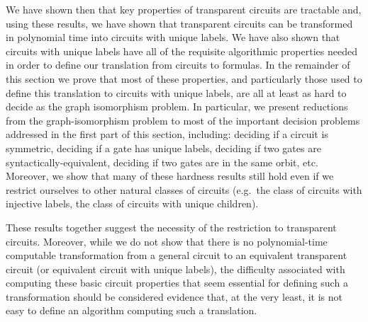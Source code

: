 \documentclass[../paper.tex]{subfiles}
\begin{document}

We have shown then that key properties of transparent circuits are tractable
and, using these results, we have shown that transparent circuits can be
transformed in polynomial time into circuits with unique labels. We have also
shown that circuits with unique labels have all of the requisite algorithmic
properties needed in order to define our translation from circuits to formulas.
In the remainder of this section we prove that most of these properties, and
particularly those used to define this translation to circuits with unique
labels, are all at least as hard to decide as the graph isomorphism problem. In
particular, we present reductions from the graph-isomorphism problem to most of
the important decision problems addressed in the first part of this section,
including: deciding if a circuit is symmetric, deciding if a gate has unique
labels, deciding if two gates are syntactically-equivalent, deciding if two
gates are in the same orbit, etc. Moreover, we show that many of these hardness
results still hold even if we restrict ourselves to other natural classes of
circuits (e.g.\ the class of circuits with injective labels, the class of
circuits with unique children).

These results together suggest the necessity of the restriction to transparent
circuits. Moreover, while we do not show that there is no polynomial-time
computable transformation from a general circuit to an equivalent transparent
circuit (or equivalent circuit with unique labels), the difficulty associated
with computing these basic circuit properties that seem essential for defining
such a transformation should be considered evidence that, at the very least, it
is not easy to define an algorithm computing such a translation.

\end{document}

